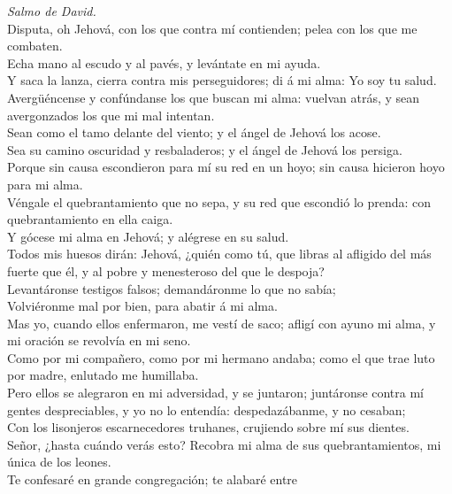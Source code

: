  \emph{Salmo de David.}\\
Disputa, oh Jehová, con los que contra mí contienden; pelea con los que
me combaten.\\
 Echa mano al escudo y al pavés, y levántate en mi ayuda.\\
 Y saca la lanza, cierra contra mis perseguidores; di á mi
alma: Yo soy tu salud.\\
 Avergüéncense y confúndanse los que buscan mi alma: vuelvan
atrás, y sean avergonzados los que mi mal intentan.\\
 Sean como el tamo delante del viento; y el ángel de Jehová
los acose.\\
 Sea su camino oscuridad y resbaladeros; y el ángel de
Jehová los persiga.\\
 Porque sin causa escondieron para mí su red en un hoyo; sin
causa hicieron hoyo para mi alma.\\
 Véngale el quebrantamiento que no sepa, y su red que
escondió lo prenda: con quebrantamiento en ella caiga.\\
 Y gócese mi alma en Jehová; y alégrese en su salud.\\
 Todos mis huesos dirán: Jehová, ¿quién como tú, que libras
al afligido del más fuerte que él, y al pobre y menesteroso del que le
despoja?\\
 Levantáronse testigos falsos; demandáronme lo que no
sabía;\\
 Volviéronme mal por bien, para abatir á mi alma.\\
 Mas yo, cuando ellos enfermaron, me vestí de saco; afligí
con ayuno mi alma, y mi oración se revolvía en mi seno.\\
 Como por mi compañero, como por mi hermano andaba; como el
que trae luto por madre, enlutado me humillaba.\\
 Pero ellos se alegraron en mi adversidad, y se juntaron;
juntáronse contra mí gentes despreciables, y yo no lo entendía:
despedazábanme, y no cesaban;\\
 Con los lisonjeros escarnecedores truhanes, crujiendo
sobre mí sus dientes.\\
 Señor, ¿hasta cuándo verás esto? Recobra mi alma de sus
quebrantamientos, mi única de los leones.\\
 Te confesaré en grande congregación; te alabaré entre
